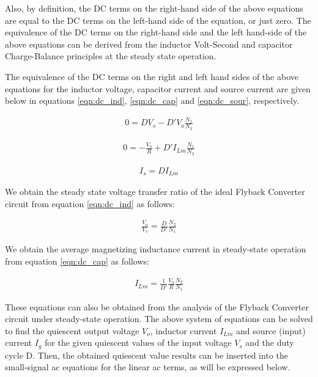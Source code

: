 Also, by definition, the DC terms on the right-hand side of the above equations are equal to the DC terms on the left-hand side of the equation, or just zero. The equivalence of the DC terms on the right-hand side and the left hand-side of the above equations can be derived from the inductor Volt-Second and capacitor Charge-Balance principles at the steady state operation. 

The equivalence of the DC terms on the right and left hand sides of the above equations for the inductor voltage, capacitor current and source current are given below in equations \eqref{eqn:dc_ind}, \eqref{eqn:dc_cap} and \eqref{eqn:dc_sour}, respectively.

\begin{align}
    0 = DV_s - D'V_o\frac{N_1}{N_2}
    \label{eqn:dc_ind}
\end{align}

\begin{align}
    0 = -\frac{V_o}{R} + D'I_{Lm}\frac{N_1}{N_2}
    \label{eqn:dc_cap}
\end{align}

\begin{align}
    I_s = DI_{Lm}
    \label{eqn:dc_sour}
\end{align}

We obtain the steady state voltage transfer ratio of the ideal Flyback Converter circuit from equation \eqref{eqn:dc_ind} as follows:

\begin{align}
    \frac{V_o}{V_s} = \frac{D}{D'}\frac{N_2}{N_1}
\end{align}

We obtain the average magnetizing inductance current in steady-state operation from equation \eqref{eqn:dc_cap} as follows:

\begin{align}
    I_{Lm} = \frac{1}{D'}\frac{V_o}{R}\frac{N_2}{N_1}
\end{align}

These equations can also be obtained from the analysis of the Flyback Converter circuit under steady-state operation. The above system of equations can be solved to find the quiescent output voltage $V_o$, inductor current $I_{Lm}$ and source (input) current $I_g$ for the given quiescent values of the input voltage $V_s$ and the duty cycle D. Then, the obtained quiescent value results can be inserted into the small-signal ac equations for the linear ac terms, as will be expressed below.

